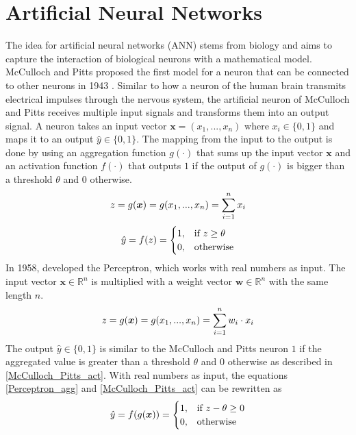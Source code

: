\section{Artificial Neural Networks}
The idea for artificial neural networks (ANN) stems from biology and aims to capture the interaction of biological neurons with a mathematical model.
McCulloch and Pitts proposed the first model for a neuron that can be connected to other neurons in 1943 .
Similar to how a neuron of the human brain transmits electrical impulses through the nervous system, the artificial neuron of McCulloch and Pitts receives multiple input signals and transforms them into an output signal.
A neuron takes an input vector $\boldsymbol{x} = (x_1, ..., x_n)$ where $x_i \in \{0, 1\}$ and maps it to an output $\hat{y} \in \{0, 1\}$.
The mapping from the input to the output is done by using an aggregation function $g(\cdot)$ that sums up the input vector $\boldsymbol{x}$ and an activation function $f(\cdot)$ that outputs $1$ if the output of $g(\cdot)$ is bigger than a threshold $\theta$ and $0$ otherwise.
%
\begin{equation}\eqlbl{McCulloch_Pitts_agg}%
	z = g(\boldsymbol{x}) = g(x_1, ..., x_n) = \sum_{i=1}^{n}x_i\\
\end{equation}
%
\begin{equation}\eqlbl{McCulloch_Pitts_act}%
		\hat{y} = f(z) = \begin{cases}
      		1, & \text{if}\ z \geq \theta \\
      		0, & \text{otherwise}
    	\end{cases}
\end{equation}
%
In 1958,  developed the Perceptron, which works with real numbers as input.
The input vector $\boldsymbol{x} \in \mathbb{R}^n$ is multiplied with a weight vector $\boldsymbol{w} \in \mathbb{R}^n$ with the same length $n$.
%
\begin{equation}\eqlbl{Perceptron_agg}%
	z = g(\boldsymbol{x}) = g(x_1, ..., x_n) = \sum_{i=1}^{n} w_i \cdot x_i\\
\end{equation}
%
The output $\hat{y} \in \{0, 1\}$ is similar to the McCulloch and Pitts neuron $1$ if the aggregated value is greater than a threshold $\theta$ and $0$ otherwise as described in \eqref{McCulloch_Pitts_act}. With real numbers as input, the equations \eqref*{Perceptron_agg} and \eqref*{McCulloch_Pitts_act} can be rewritten as
%
\begin{equation}\eqlbl{Perceptron}%
		\hat{y} =f(g(\boldsymbol{x})) = \begin{cases}
      		1, & \text{if}\ z - \theta \geq 0 \\
      		0, & \text{otherwise}
    	\end{cases}
\end{equation}
